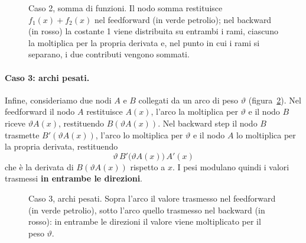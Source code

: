 \begin{figure}[htbp]
\centering
{}
\caption{Caso 2, somma di funzioni. Il nodo somma restituisce $f_1(x) + f_2(x)$ nel feedforward (in verde petrolio); nel backward (in rosso) la costante 1 viene distribuita su entrambi i rami, ciascuno la moltiplica per la propria derivata e, nel punto in cui i rami si separano, i due contributi vengono sommati.}
\label{fig:caso-somma}
\end{figure}

\paragraph{Caso 3: archi pesati.}
Infine, consideriamo due nodi $A$ e $B$ collegati da un arco di peso $\vartheta$ (figura~\ref{fig:caso-pesi}). Nel feedforward il nodo $A$ restituisce $A(x)$, l'arco la moltiplica per $\vartheta$ e il nodo $B$ riceve $\vartheta A(x)$, restituendo $B(\vartheta A(x))$. Nel backward step il nodo $B$ trasmette $B'(\vartheta A(x))$, l'arco lo moltiplica per $\vartheta$ e il nodo $A$ lo moltiplica per la propria derivata, restituendo
\[
\vartheta\, B'\big(\vartheta A(x)\big)\, A'(x)
\]
che è la derivata di $B(\vartheta A(x))$ rispetto a $x$. I pesi modulano quindi i valori trasmessi \textbf{in entrambe le direzioni}.

\begin{figure}[htbp]
\centering
{}
\caption{Caso 3, archi pesati. Sopra l'arco il valore trasmesso nel feedforward (in verde petrolio), sotto l'arco quello trasmesso nel backward (in rosso): in entrambe le direzioni il valore viene moltiplicato per il peso $\vartheta$.}
\label{fig:caso-pesi}
\end{figure}

